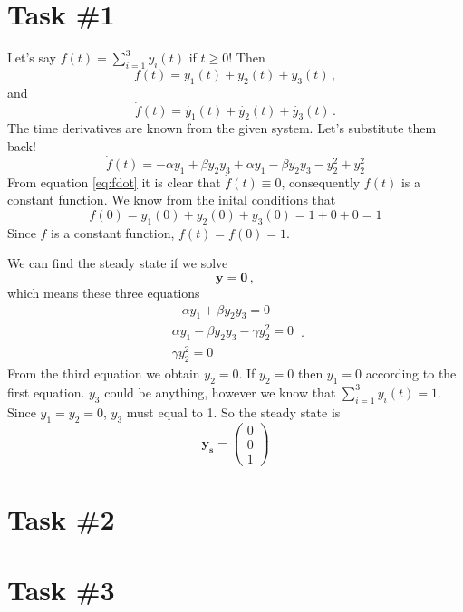 \documentclass[12pt]{report}
\newcommand{\matr}[1]{\bm{#1}}
\begin{document}
	
	\section*{Task \#1}
	
	Let's say $f(t)=\sum_{i=1}^{3}y_i(t)$ if $t\geq 0$! Then 
	\begin{equation}
		f(t)=y_1(t)+y_2(t)+y_3(t)\,,
	\end{equation}
	and
	\begin{equation}
	\dot{f}(t)=\dot{y_1}(t)+\dot{y_2}(t)+\dot{y_3}(t)\,.
	\end{equation}
	The time derivatives are known from the given system. Let's substitute them back!
	\begin{equation}
	\dot{f}(t)=-\alpha y_1+\beta y_2y_3+\alpha y_1-\beta y_2y_3 -y_{2}^2+y_{2}^2
	\label{eq:fdot}	
	\end{equation}
	From equation \ref{eq:fdot} it is clear that $\dot{f}(t)\equiv 0$, consequently $f(t)$ is a constant function. We know from the inital conditions that
	\begin{equation}
		f(0)=y_1(0)+y_2(0)+y_3(0)=1+0+0=1
	\end{equation}
	Since $f$ is a constant function, $f(t)=f(0)=1$.
	
	We can find the steady state if we solve
	\begin{equation}
		\matr{\dot{y}}=\matr{0} \,,
	\end{equation}
	which means these three equations
	\begin{equation}
		\begin{aligned}
		-\alpha y_1 + \beta y_2 y_3 = 0 \\
		\alpha y_1 - \beta y_2 y_3 - \gamma y_2^2 = 0 \\
		\gamma y_2^2 = 0
		\end{aligned} \,.
	\end{equation}
	From the third equation we obtain $y_2=0$. If $y_2=0$ then $y_1=0$ according to the first equation. $y_3$ could be anything, however we know that $\sum_{i=1}^{3}y_i(t)=1$. Since $y_1=y_2=0$, $y_3$ must equal to 1. So the steady state is
	$$
	\matr{y_s}=\begin{pmatrix}
		0 \\ 
		0\\ 
		1
	\end{pmatrix}
	$$

	\section*{Task \#2}
	
	
	\section*{Task \#3}
	
\end{document}
